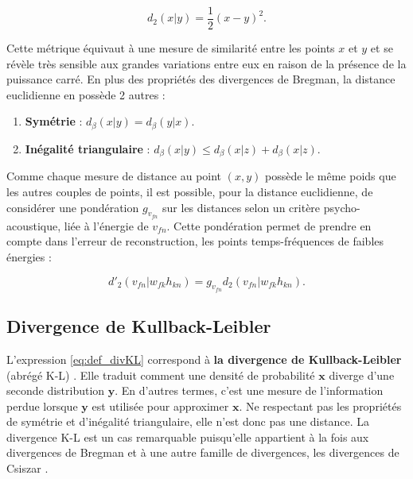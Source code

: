 \begin{equation}
d_{{2}}(x\vert y) = \dfrac{1}{2}(x-y)^2.
\end{equation}

Cette métrique équivaut à une mesure de similarité entre les points $x$ et $y$ et se révèle très sensible aux grandes variations entre eux en raison de la présence de la puissance carré. En plus des propriétés des divergences de Bregman, la distance euclidienne en possède 2 autres :
\begin{enumerate}

\item \textbf{Symétrie} : $d_{\beta}(x \vert y ) = d_{\beta}(y \vert x)$.

\item \textbf{Inégalité triangulaire} : $d_{\beta}(x \vert y ) \leq d_{\beta}(x \vert z ) + d_{\beta}(x \vert z )$.\\
\end{enumerate}

Comme chaque mesure de distance au point $(x,y)$ possède le même poids que les autres couples de points, il est possible, pour la distance euclidienne, de considérer une pondération $g_{v_{fn}}$  sur les distances selon un critère psycho-acoustique, liée à l'énergie de $v_{fn}$. Cette pondération permet de prendre en compte dans l'erreur de reconstruction, les points temps-fréquences de faibles énergies \cite{virtanen2004separation} :

\begin{equation}
d'_2(v_{fn} \vert w_{fk} h_{kn}) = g_{v_{fn}} d_2 (v_{fn} \vert w_{fk} h_{kn}).
\end{equation}

\subsection{Divergence de Kullback-Leibler}\label{part:div_KL}
L'expression \ref{eq:def_divKL} correspond à \textbf{la divergence de Kullback-Leibler} (abrégé K-L) \cite{kompass_generalized_2007, cichocki_new_2006} . Elle traduit comment une densité de probabilité $\mathbf{x}$ diverge d'une seconde distribution $\mathbf{y}$. En d'autres termes, c'est une mesure de l'information perdue lorsque $\mathbf{y}$ est utilisée pour approximer $\mathbf{x}$. Ne respectant pas les propriétés de symétrie et d'inégalité triangulaire, elle n'est donc pas une distance. La divergence K-L est un cas remarquable puisqu'elle appartient à la fois aux divergences de Bregman et à une autre famille de divergences, les divergences de Csiszar \cite{cichocki_csiszars_2006}.

